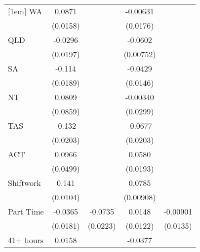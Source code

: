 {\begin{tabular}{l*{4}{c}}
[1em]
WA                  &      0.0871\sym{***}&                     &    -0.00631         &                     \\
                    &    (0.0158)         &                     &    (0.0176)         &                     \\
[1em]
QLD                 &     -0.0296         &                     &     -0.0602\sym{***}&                     \\
                    &    (0.0197)         &                     &   (0.00752)         &                     \\
[1em]
SA                  &      -0.114\sym{***}&                     &     -0.0429\sym{**} &                     \\
                    &    (0.0189)         &                     &    (0.0146)         &                     \\
[1em]
NT                  &      0.0809         &                     &    -0.00340         &                     \\
                    &    (0.0859)         &                     &    (0.0299)         &                     \\
[1em]
TAS                 &      -0.132\sym{***}&                     &     -0.0677\sym{***}&                     \\
                    &    (0.0203)         &                     &    (0.0203)         &                     \\
[1em]
ACT                 &      0.0966         &                     &      0.0580\sym{**} &                     \\
                    &    (0.0499)         &                     &    (0.0193)         &                     \\
[1em]
Shiftwork           &       0.141\sym{***}&                     &      0.0785\sym{***}&                     \\
                    &    (0.0104)         &                     &   (0.00908)         &                     \\
[1em]
Part Time           &     -0.0365\sym{*}  &     -0.0735\sym{***}&      0.0148         &    -0.00901         \\
                    &    (0.0181)         &    (0.0223)         &    (0.0122)         &    (0.0135)         \\
[1em]
41+ hours           &      0.0158         &                     &     -0.0377\sym{***}&                     \\

\end{tabular}}
